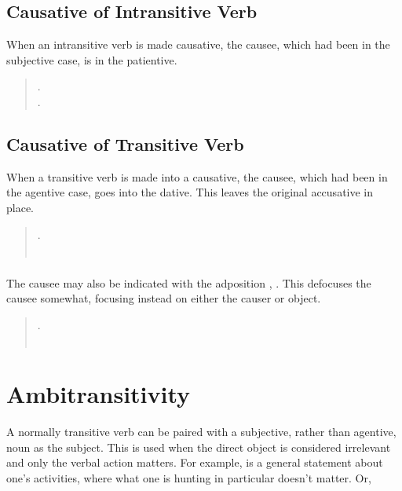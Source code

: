 \subsection{Causative of Intransitive Verb} When an intransitive verb
is made causative, the causee, which had been in the subjective case,
is in the patientive.

\begin{quotation}
\noindent{} .\\
\noindent{} .
\end{quotation}

\subsection{Causative of Transitive Verb} When a transitive verb is
made into a causative, the causee, which had been in the agentive
case, goes into the dative.  This leaves the original accusative in
place.  \label{syn:trans-causative}

\begin{quotation}
\noindent{} .\\
\noindent{}\\
\indent {} 
\end{quotation}

\subsubsection{} The causee may also be indicated with the adposition
, .  This defocuses the causee somewhat, focusing
instead on either the causer or object.

\begin{quotation}
\noindent{} .\\
\noindent{} \\
\indent {} 
\end{quotation}



\section{Ambitransitivity}
\noindent A normally transitive verb can be paired with a subjective,
rather than agentive, noun as the subject.  This is used when the
direct object is considered irrelevant and only the verbal action
matters. For example,   is a general statement
about one's activities, where what one is hunting in particular
doesn't matter. Or,  

